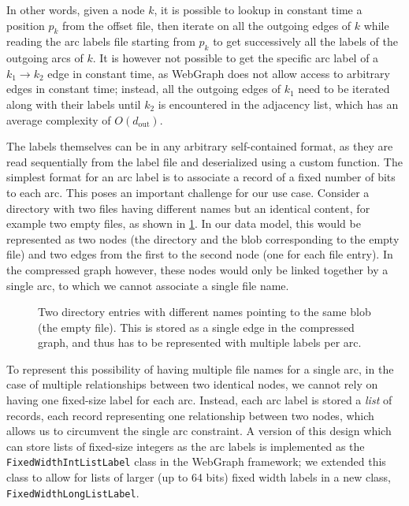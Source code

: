 In other words, given a node $k$, it is possible to lookup in constant time
a position $p_k$ from the offset file, then iterate on all the outgoing edges
of $k$ while reading the arc labels file starting from $p_k$ to get
successively all the labels of the outgoing arcs of $k$. It is however not
possible to get the specific arc label of a $k_1 \to k_2$ edge in constant
time, as WebGraph does not allow access to arbitrary edges in constant time;
instead, all the outgoing edges of $k_1$ need to be iterated along with their
labels until $k_2$ is encountered in the adjacency list, which has an average
complexity of $O(d_{\mathrm{out}})$.


The labels themselves can be in any arbitrary self-contained format, as they
are read sequentially from the label file and deserialized using a custom
function. The simplest format for an arc label is to associate a record of a
fixed number of bits to each arc. This poses an important challenge for
our use case. Consider a directory with two files having different names but
an identical content, for example two empty files, as shown in
\cref{fig:multiple-labels}. In our data model, this would be represented as two
nodes (the directory and the blob corresponding to the empty file) and two
edges from the first to the second node (one for each file entry). In the
compressed graph however, these nodes would only be linked together by a single
arc, to which we cannot associate a single file name.

\begin{figure}
    \centering
    \caption{Two directory entries with different names pointing to the same
        blob (the empty file). This is stored as a single edge in the
        compressed graph, and thus has to be represented with multiple labels per
    arc.}%
    \label{fig:multiple-labels}
\end{figure}

To represent this possibility of having multiple file names for a single arc,
in the case of multiple relationships between two identical nodes, we cannot
rely on having one fixed-size label for each arc. Instead, each arc label is
stored a \emph{list} of records, each record representing one relationship
between two nodes, which allows us to circumvent the single arc constraint.
A version of this design which can store lists of fixed-size integers as the
arc labels is implemented as the \texttt{FixedWidthIntListLabel} class in the
WebGraph framework; we extended this class to allow for lists of larger (up to
64 bits) fixed width labels in a new class, \texttt{FixedWidthLongListLabel}.

